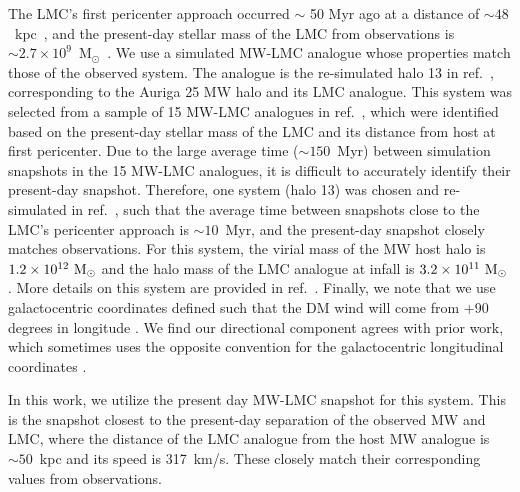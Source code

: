 \documentclass[12pt]{article}
\newcommand{\Msun}{{\rm M}_\odot}
\begin{document}
 The LMC's first pericenter approach occurred $\sim$ 50 Myr ago \cite{Besla:2007kf} at a distance of $\sim 48$~kpc~\cite{Besla:2007kf}, and the present-day stellar mass of the LMC from observations is $\sim 2.7 \times 10^9$~M$_\odot$~\cite{vanderMarel:2002kq}. We use a simulated MW-LMC analogue whose properties match those of the observed system. The analogue is the re-simulated halo 13 in ref.~\cite{Smith-Orlik:2023kyl}, corresponding to the Auriga 25 MW halo and its LMC analogue. This system was selected from a sample of 15 MW-LMC analogues in ref.~\cite{Smith-Orlik:2023kyl}, which were identified based on the present-day stellar mass of the LMC and its distance from host at first pericenter. Due to the large average time ($\sim 150$~Myr) between simulation snapshots in the 15 MW-LMC analogues, it is difficult to accurately identify their present-day snapshot. Therefore, one system (halo 13) was chosen and re-simulated in ref.~\cite{Smith-Orlik:2023kyl}, such that the average time between snapshots close to the LMC's pericenter approach is $\sim 10$~Myr, and the present-day snapshot closely matches observations. For this system, the virial mass of the MW host halo is $1.2 \times 10^{12}~\Msun$ and the halo mass of the LMC analogue at infall is $3.2 \times 10^{11}~\Msun$. More details on this system are provided in ref.~\cite{Smith-Orlik:2023kyl}. Finally, we note that we use galactocentric coordinates defined such that the DM wind will come from +90 degrees in longitude \cite{Bozorgnia:2016ogo,Smith-Orlik:2023kyl}. We find our directional component agrees with prior work, which sometimes uses the opposite convention for the galactocentric longitudinal coordinates \cite{Donaldson:2021byu}.
 
 

In this work, we utilize the present day MW-LMC snapshot for this system. This is the snapshot closest to the present-day separation of the observed MW and LMC, where the distance of the LMC analogue from the host MW analogue is $\sim 50$~kpc and its speed is 317~km/s. These closely match  their corresponding  values from observations. 
\end{document}

